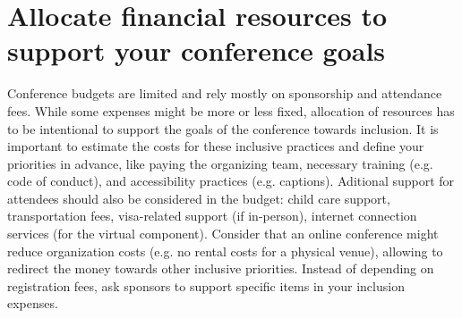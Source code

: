 \documentclass[10pt,letterpaper]{article}
\begin{document}


\section{Allocate financial resources to support your conference goals}
\label{rule_financial}

Conference budgets are limited and rely mostly on sponsorship and attendance fees. 
While some expenses might be more or less fixed, %
allocation of resources has to be intentional to support the goals of the conference towards inclusion. 
It is important to estimate the costs for these inclusive practices and define your priorities in advance, like paying the organizing team, necessary training (e.g. code of conduct), and accessibility practices (e.g. captions). 
Aditional support for attendees should also be considered in the budget: child care support, transportation fees, visa-related support (if in-person), internet connection services (for the virtual component). 
Consider that an online conference might reduce organization costs (e.g. no rental costs for a physical venue), allowing to redirect the money towards other inclusive priorities. 
Instead of depending on registration fees, ask sponsors to support specific items in your inclusion expenses.
\end{document}
